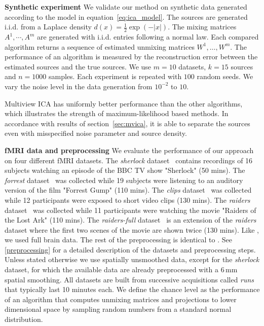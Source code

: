 \textbf{Synthetic experiment}
We validate our method on synthetic data generated according to the model in equation~\eqref{eq:ica_model}.
%
The sources are generated i.i.d. from a Laplace density $d(x)=\frac12\exp(-|x|)$.
%
The mixing matrices $A^1,\cdots, A^m$ are generated with i.i.d. entries following a normal law.
Each compared algorithm returns a sequence of estimated unmixing matrices $W^1, \dots, W^m$.
%
The performance of an algorithm is measured by the reconstruction error between the estimated sources and the true sources.
%
%
We use $m=10$ datasets, $k=15$ sources and $n=1000$ samples. Each experiment is repeated with $100$ random seeds.
%
We vary the noise level in the data generation from $10^{-2}$ to $10$.

Multiview ICA has uniformly better performance than the other algorithms, which illustrates the strength of maximum-likelihood based methods. In accordance with results of section~\ref{sec:mvica}, it is able to separate the sources even with misspecified noise parameter and source density.
%

\textbf{fMRI data and preprocessing} 
We evaluate the performance of our approach on four different fMRI datasets.
%
The \emph{sherlock} dataset~\cite{chen2017shared} contains recordings of 16 subjects watching an episode of the BBC TV show "Sherlock" (50 mins).
%
The \emph{forrest} dataset~\cite{hanke2014high} was collected while 19 subjects were listening to an auditory version of the film "Forrest Gump" (110 mins).
%
The \emph{clips} dataset~\cite{ibc} was collected while 12 participants were exposed to short video clips (130 mins).
%
The \emph{raiders} dataset~\cite{ibc} was collected while 11 participants were watching the movie "Raiders of the Lost Ark" (110 mins).
%
The \emph{raiders-full} dataset~\cite{ibc} is an extension of the \emph{raiders} dataset where the first two scenes of the movie are shown twice (130 mins).
%
Like \cite{zhang2016searchlight}, we used full brain data. The rest of the preprocessing is identical to \cite{chen2017shared}. See \ref{preprocessing} for a detailed description of the datasets and preprocessing steps. Unless stated otherwise we use spatially unsmoothed data, except for the \emph{sherlock} dataset, for which the available data are already preprocessed with a 6\,mm spatial smoothing. All datasets are built from successive acquisitions called \emph{runs} that typically last 10 minutes each.
%
We define the chance level as the performance of an algorithm that computes unmixing matrices and projections to lower dimensional space by sampling random numbers from a standard normal distribution. 
%

